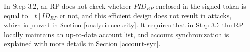 In Step 3.2, an RP does not check whether $PID_{RP}$ enclosed in the signed token is equal to $[t]ID_{RP}$ or not,
    and this efficient design does not result in attacks, which is proved in Section \ref{analysis-security}.
It requires that in Step 3.3 the RP locally maintains an up-to-date account list,
    and account synchronization is explained with more details in Section \ref{account-syn}.

%

